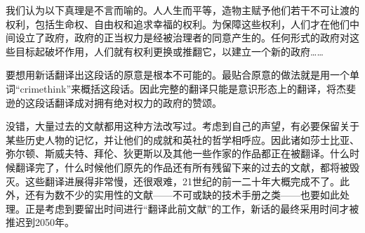 我们认为以下真理是不言而喻的。人人生而平等，造物主赋予他们若干不可让渡的权利，包括生命权、自由权和追求幸福的权利。为保障这些权利，人们才在他们中间设立了政府，政府的正当权力是经被治理者的同意产生的。任何形式的政府对这些目标起破坏作用，人们就有权利更换或推翻它，以建立一个新的政府\ldots\ldots{}

要想用新话翻译出这段话的原意是根本不可能的。最贴合原意的做法就是用一个单词``crimethink''来概括这段话。因此完整的翻译只能是意识形态上的翻译，将杰斐逊的这段话翻译成对拥有绝对权力的政府的赞颂。

没错，大量过去的文献都用这种方法改写过。考虑到自己的声望，有必要保留关于某些历史人物的记忆，并让他们的成就和英社的哲学相呼应。因此诸如莎士比亚、弥尔顿、斯威夫特、拜伦、狄更斯以及其他一些作家的作品都正在被翻译。什么时候翻译完了，什么时候他们原先的作品还有所有残留下来的过去的文献，都将被毁灭。这些翻译进展得非常慢，还很艰难，21世纪的前一二十年大概完成不了。此外，还有为数不少的实用性的文献------不可或缺的技术手册之类------也要如此处理。正是考虑到要留出时间进行``翻译此前文献''的工作，新话的最终采用时间才被推迟到2050年。

